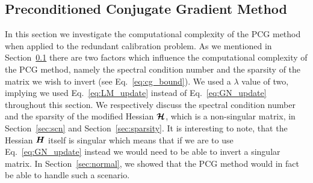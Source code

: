 \documentclass[useAMS,usenatbib]{mn2e}
\newcommand{\bH}{\bmath{H}}
\newcommand{\bmH}{\bmath{\mathcal{H}}}
\begin{document}
% 
% 
% 
% 
% 
% 
% 

\subsection{Preconditioned Conjugate Gradient Method}
\label{sec:pcg}
In this section we investigate the computational complexity of the PCG method when applied to the redundant calibration problem. 
As we mentioned in Section~\ref{sec:pcg} there are two factors which influence the computational complexity of the PCG method, namely the spectral condition number and the sparsity of the matrix we wish to invert (see Eq.~\eqref{eq:cg_bound}). 
We used a $\lambda$ value of two, implying we used Eq.~\eqref{eq:LM_update} instead of Eq.~\eqref{eq:GN_update} throughout this section.
We respectively discuss the spectral condition number and the sparsity of the modified Hessian $\bmH$, which is a non-singular matrix, in Section~\ref{sec:scn} and Section~\ref{sec:sparsity}.
It is interesting to note, that the Hessian $\bH$ itself is singular which means that if we are to use Eq.~\eqref{eq:GN_update} instead we would need to be able to invert a singular matrix. In Section~\ref{sec:normal},
we showed that the PCG method would in fact be able to handle such a scenario.
\end{document}
